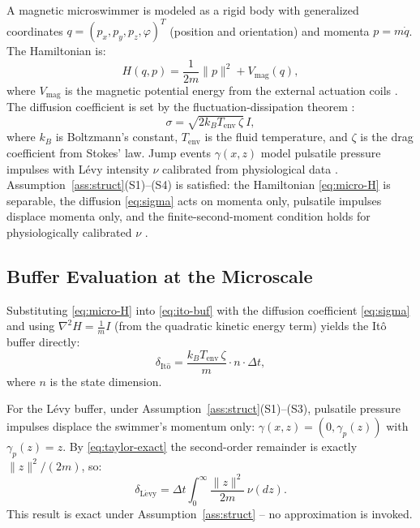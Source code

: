 \documentclass[11pt]{article}
\begin{document}
A magnetic microswimmer is modeled as a rigid body with generalized coordinates
$q=(p_x,p_y,p_z,\varphi)^T$ (position and orientation) and momenta $p=m\dot{q}$. The
Hamiltonian is:
\begin{equation}
H(q,p) = \frac{1}{2m}\|p\|^2 + V_{\mathrm{mag}}(q),
\label{eq:micro-H}
\end{equation}
where $V_{\mathrm{mag}}$ is the magnetic potential energy from the external actuation coils
\cite{sitti2018}. The diffusion coefficient is set by the fluctuation-dissipation theorem
\cite{einstein1905}:
\begin{equation}
\sigma = \sqrt{2k_B T_{\mathrm{env}}\,\zeta}\,I,
\label{eq:sigma}
\end{equation}
where $k_B$ is Boltzmann's constant, $T_{\mathrm{env}}$ is the fluid temperature, and $\zeta$
is the drag coefficient from Stokes' law. Jump events $\gamma(x,z)$ model pulsatile pressure
impulses with L\'{e}vy intensity $\nu$ calibrated from physiological data \cite{ku1997}.
Assumption~\ref{ass:struct}(S1)--(S4) is satisfied: the Hamiltonian \eqref{eq:micro-H} is
separable, the diffusion \eqref{eq:sigma} acts on momenta only, pulsatile impulses displace
momenta only, and the finite-second-moment condition holds for physiologically calibrated
$\nu$ \cite{ku1997}.

\subsection{Buffer Evaluation at the Microscale}

Substituting \eqref{eq:micro-H} into \eqref{eq:ito-buf} with the diffusion coefficient
\eqref{eq:sigma} and using $\nabla^2 H=\frac{1}{m}I$ (from the quadratic kinetic energy term)
yields the It\^{o} buffer directly:
\begin{equation}
\delta_{\mathrm{It\hat{o}}} = \frac{k_B T_{\mathrm{env}}\,\zeta}{m}\cdot n\cdot\Delta t,
\label{eq:ito-micro}
\end{equation}
where $n$ is the state dimension.

For the L\'{e}vy buffer, under Assumption~\ref{ass:struct}(S1)--(S3), pulsatile pressure
impulses displace the swimmer's momentum only: $\gamma(x,z)=(0,\gamma_p(z))$ with
$\gamma_p(z)=z$. By \eqref{eq:taylor-exact} the second-order remainder is exactly
$\|z\|^2/(2m)$, so:
\begin{equation}
\delta_{\mathrm{L\acute{e}vy}} = \Delta t\int_0^\infty\frac{\|z\|^2}{2m}\,\nu(dz).
\label{eq:levy-micro}
\end{equation}
This result is exact under Assumption~\ref{ass:struct} -- no approximation is invoked.
\end{document}
